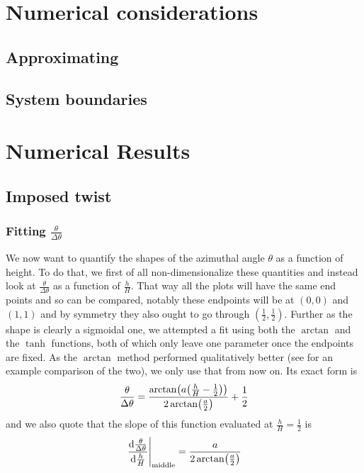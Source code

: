 \documentclass[12pt]{article}
\newcommand{\suf}[2]{\stackunder[1pt]{\ensuremath{#1}}{\rule{\widthof{\ensuremath{#2}}*\real{0.9}}{.1ex}}}
\newcommand{\duf}[2]{\stackunder[1pt]{\suf{\ensuremath{#1}}{#2}}{\rule{\widthof{\ensuremath{#2}}*\real{0.9}}{.1ex}}}
\newcommand{\du}[1]{\duf{#1}{#1}}
\newcommand{\PP}{\du{\Pi}}
\begin{document}
\section{Numerical considerations}
\subsection{Approximating \PP{}}
\subsection{System boundaries }

\section{Numerical Results}
\subsection{Imposed twist}
\subsubsection{Fitting $\frac{\theta}{\Delta\theta}$}
We now want to quantify the shapes of the azimuthal angle $\theta$ as a function of height.
To do that, we first of all non-dimensionalize these quantities and instead look at $\frac{\theta}{\Delta\theta}$ as a function of $\frac{h}{H}$.
That way all the plots will have the same end points and so can be compared, notably these endpoints will be at $(0, 0)$ and $(1, 1)$ and by symmetry they also ought to go through $(\frac{1}{2}, \frac{1}{2})$.
Further as the shape is clearly a sigmoidal one, we attempted a fit using both the $\arctan$ and the $\tanh$ functions, both of which only leave one parameter once the endpoints are fixed.
As the $\arctan$ method performed qualitatively better (see  for an example comparison of the two), we only use that from now on.
Its exact form is
\begin{equation}
    \frac{\theta}{\Delta\theta} = \frac{\arctan(a \qty(\frac{h}{H} - \frac{1}{2}))}{2\arctan(\frac{a}{2})} + \frac{1}{2}
\end{equation}
and we also quote that the slope of this function evaluated at $\frac{h}{H} = \frac{1}{2}$ is
\begin{equation}
    \eval{\dv{\frac{\theta}{\Delta\theta}}{\frac{h}{H}}}_\text{middle} = \frac{a}{2\arctan(\frac{a}{2})}
\end{equation}
\end{document}
